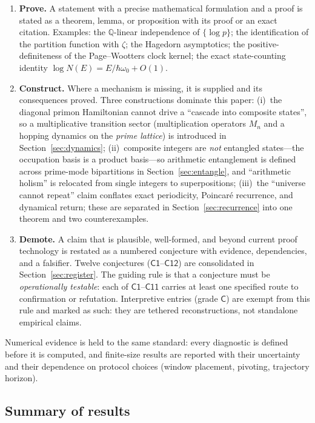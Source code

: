\documentclass[11pt,a4paper]{article}
\theoremstyle{plain}
\theoremstyle{definition}
\theoremstyle{remark}
\newcommand{\Qq}{\mathbb{Q}}
\begin{document}
\begin{enumerate}[leftmargin=1.6em]
\item \textbf{Prove.} A statement with a precise mathematical formulation and a proof is
stated as a theorem, lemma, or proposition with its proof or an exact citation. Examples: the
$\Qq$-linear independence of $\{\log p\}$; the identification of the partition function with
$\zeta$; the Hagedorn asymptotics; the positive-definiteness of the Page--Wootters clock kernel;
the exact state-counting identity $\log N(E)=E/\hbar\omega_{0}+O(1)$.
\item \textbf{Construct.} Where a mechanism is missing, it is supplied and its consequences
proved. Three constructions dominate this paper:
(i)~the diagonal primon Hamiltonian cannot drive a ``cascade into composite states'', so a
multiplicative transition sector (multiplication operators $M_{n}$ and a hopping dynamics on
the \emph{prime lattice}) is introduced in Section~\ref{sec:dynamics};
(ii)~composite integers are \emph{not} entangled states---the occupation basis is a product
basis---so arithmetic entanglement is defined across prime-mode bipartitions in
Section~\ref{sec:entangle}, and ``arithmetic holism'' is relocated from single integers to
superpositions;
(iii)~the ``universe cannot repeat'' claim conflates exact periodicity, Poincar\'e recurrence,
and dynamical return; these are separated in Section~\ref{sec:recurrence} into one theorem and
two counterexamples.
\item \textbf{Demote.} A claim that is plausible, well-formed, and beyond current proof
technology is restated as a numbered conjecture with evidence, dependencies, and a falsifier.
Twelve conjectures ($\mathsf{C1}$--$\mathsf{C12}$) are consolidated in Section~\ref{sec:register}.
The guiding rule is that a conjecture must be \emph{operationally testable}: each of
$\mathsf{C1}$--$\mathsf{C11}$ carries at least one specified route to confirmation or refutation.
Interpretive entries (grade $\mathsf{C}$) are exempt from this rule and marked as such: they are
tethered reconstructions, not standalone empirical claims.
\end{enumerate}

Numerical evidence is held to the same standard: every diagnostic is defined before it is
computed, and finite-size results are reported with their uncertainty and their dependence on
protocol choices (window placement, pivoting, trajectory horizon).

\subsection{Summary of results}
\end{document}
